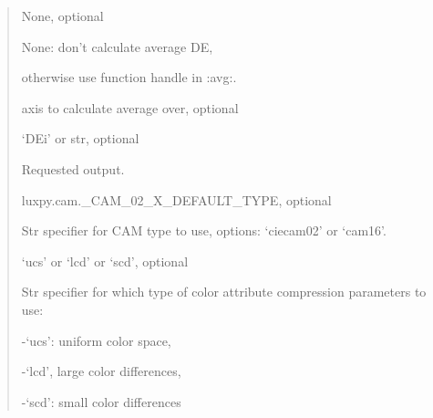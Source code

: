 \documentclass[letterpaper,10pt,english]{sphinxmanual}
\begin{document}
\begin{fulllineitems}
\begin{description}
\begin{quote}
\begin{description}
\item[{avg}] \leavevmode
\begin{DUlineblock}{0em}
\item[] None, optional
\item[] None: don’t calculate average DE, 
\item[]
\begin{DUlineblock}{\DUlineblockindent}
\item[] otherwise use function handle in :avg:.
\end{DUlineblock}
\end{DUlineblock}

\item[{avg\_axis}] \leavevmode
\begin{DUlineblock}{0em}
\item[] axis to calculate average over, optional
\end{DUlineblock}

\item[{out}] \leavevmode
\begin{DUlineblock}{0em}
\item[] ‘DEi’ or str, optional
\item[] Requested output.
\end{DUlineblock}

\item[{camtype}] \leavevmode
\begin{DUlineblock}{0em}
\item[] luxpy.cam.\_CAM\_02\_X\_DEFAULT\_TYPE, optional
\item[] Str specifier for CAM type to use, options: ‘ciecam02’ or ‘cam16’.
\end{DUlineblock}

\item[{ucstype}] \leavevmode
\begin{DUlineblock}{0em}
\item[] ‘ucs’ or ‘lcd’ or ‘scd’, optional
\item[] Str specifier for which type of color attribute compression 
parameters to use:
\item[]
\begin{DUlineblock}{\DUlineblockindent}
\item[] -‘ucs’: uniform color space, 
\item[] -‘lcd’, large color differences, 
\item[] -‘scd’: small color differences
\end{DUlineblock}
\end{DUlineblock}


\end{description}
\end{quote}
\end{description}
\end{fulllineitems}
\end{document}
